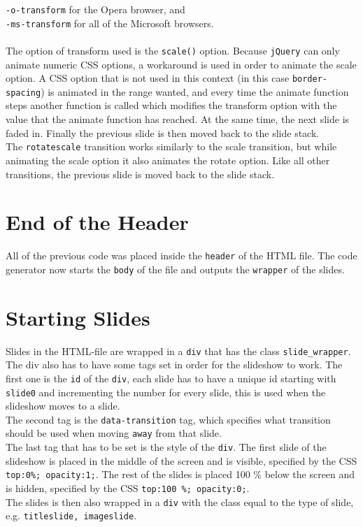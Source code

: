 \texttt{-o-transform} for the Opera browser, and \\
\texttt{-ms-transform} for all of the Microsoft browsers. \\ \\
The option of transform used is the \texttt{scale()} option. Because \texttt{jQuery} can only animate numeric CSS options, a workaround is used in order to animate the scale option. A CSS option that is not used in this context (in this case \texttt{border-spacing}) is animated in the range wanted, and every time the animate function steps another function is called which modifies the transform option with the value that the animate function has reached. At the same time, the next slide is faded in. Finally the previous slide is then moved back to the slide stack. \\
The \texttt{rotatescale} transition works similarly to the scale transition, but while animating the scale option it also animates the rotate option. Like all other transitions, the previous slide is moved back to the slide stack.

\section{End of the Header}
All of the previous code was placed inside the \texttt{header} of the HTML file. The code generator now starts the \texttt{body} of the file and outputs the \texttt{wrapper} of the slides.

\section{Starting Slides}
Slides in the HTML-file are wrapped in a \texttt{div} that has the class \texttt{slide\_wrapper}. The div also has to have some tags set in order for the slideshow to work. The first one is the \texttt{id} of the \texttt{div}, each slide has to have a unique id starting with \texttt{slide0} and incrementing the number for every slide, this is used when the slideshow moves to a slide. \\
The second tag is the \texttt{data-transition} tag, which specifies what transition should be used when moving \texttt{away} from that slide. \\
The last tag that has to be set is the style of the \texttt{div}. The first slide of the slideshow is placed in the middle of the screen and is visible, specified by the CSS \texttt{top:0\%; opacity:1;}. The rest of the slides is placed 100 \% below the screen and is hidden, specified by the CSS \texttt{top:100 \%; opacity:0;}. \\
The slides is then also wrapped in a \texttt{div} with the class equal to the type of slide, e.g. \lstinline!titleslide, imageslide!.

